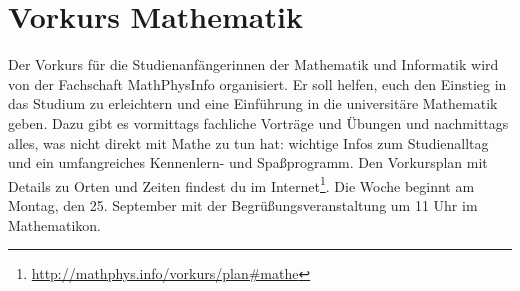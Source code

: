 \section{Vorkurs Mathematik}
Der Vorkurs für die Studienanfängerinnen der Mathematik und Informatik wird von der Fachschaft MathPhysInfo organisiert. Er soll helfen, euch den Einstieg in das Studium zu erleichtern und eine Einführung in die universitäre Mathematik geben. Dazu gibt es vormittags fachliche Vorträge und Übungen und nachmittags alles, was nicht direkt mit Mathe zu tun hat: wichtige Infos zum Studienalltag und ein umfangreiches Kennenlern- und Spaßprogramm. Den Vorkursplan mit Details zu Orten und Zeiten findest du im Internet\footnote{\label{mathe-vorkursplan}\url{http://mathphys.info/vorkurs/plan\#mathe}}. Die Woche beginnt am Montag, den 25. September mit der Begrüßungsveranstaltung um 11 Uhr im \gls{Mathematikon}.
